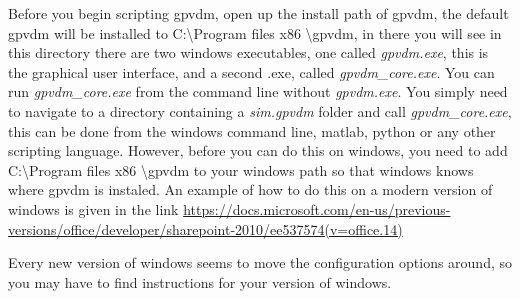 Before you begin scripting gpvdm, open up the install path of gpvdm, the default gpvdm will be installed to C:\textbackslash Program files x86 \textbackslash gpvdm, in there you will see in this directory there are two windows executables, one called \emph{gpvdm.exe}, this is the graphical user interface, and a second .exe, called \emph{gpvdm\_core.exe}.  You can run \emph{gpvdm\_core.exe} from the command line without \emph{gpvdm.exe}. You simply need to navigate to a directory containing a \emph{sim.gpvdm} folder and call \emph{gpvdm\_core.exe}, this can be done from the windows command line, matlab, python or any other scripting language.
However, before you can do this on windows, you need to add C:\textbackslash Program files x86 \textbackslash gpvdm to your windows path so that windows knows where gpvdm is instaled.  An example of how to do this on a modern version of windows is given in the link
\url{https://docs.microsoft.com/en-us/previous-versions/office/developer/sharepoint-2010/ee537574(v=office.14)}

Every new version of windows seems to move the configuration options around, so you may have to find instructions for your version of windows.



